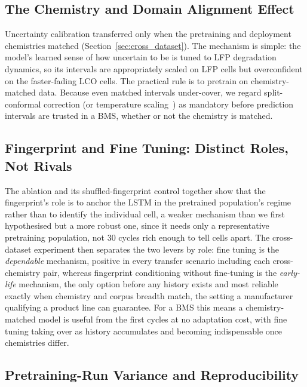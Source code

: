 \subsection{The Chemistry and Domain Alignment Effect}

Uncertainty calibration transferred only when the pretraining and deployment
chemistries matched (Section~\ref{sec:cross_dataset}). The mechanism is simple:
the model's learned sense of how uncertain to be is tuned to LFP degradation
dynamics, so its intervals are appropriately scaled on LFP cells but
overconfident on the faster-fading LCO cells. The practical rule is to pretrain
on chemistry-matched data. Because even matched intervals under-cover, we regard
split-conformal correction (or temperature scaling~\cite{guo2017calibration})
as mandatory before prediction intervals are trusted in a BMS, whether or not
the chemistry is matched.

\subsection{Fingerprint and Fine Tuning: Distinct Roles, Not Rivals}

The ablation and its shuffled-fingerprint control together show that the
fingerprint's role is to anchor the LSTM in the pretrained population's regime
rather than to identify the individual cell, a weaker mechanism than we first
hypothesised but a more robust one, since it needs only a representative
pretraining population, not 30 cycles rich enough to tell cells apart. The
cross-dataset experiment then separates the two levers by role: fine tuning is
the \emph{dependable} mechanism, positive in every transfer scenario including
each cross-chemistry pair, whereas fingerprint conditioning without fine-tuning is the
\emph{early-life} mechanism, the only option before any history exists and most
reliable exactly when chemistry and corpus breadth match, the setting a
manufacturer qualifying a product line can guarantee. For a BMS this means a
chemistry-matched model is useful from the first cycles at no adaptation cost,
with fine tuning taking over as history accumulates and becoming indispensable
once chemistries differ.

\subsection{Pretraining-Run Variance and Reproducibility}

